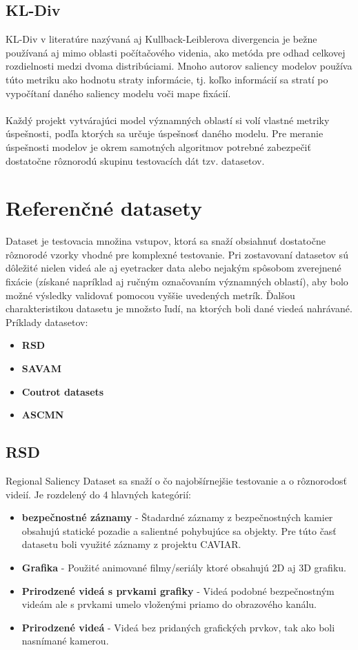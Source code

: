 \subsection{KL-Div}
KL-Div v literatúre nazývaná aj Kullback-Leiblerova divergencia\cite{kldiv} je bežne používaná aj mimo oblasti počítačového videnia, ako metóda pre odhad celkovej rozdielnosti medzi dvoma distribúciami.
Mnoho autorov saliency modelov používa túto metriku ako hodnotu straty informácie, tj. koľko informácií sa stratí po vypočítaní daného saliency modelu voči mape fixácií.
\\\\
Každý projekt vytvárajúci model významných oblastí si volí vlastné metriky úspešnosti, podľa ktorých sa určuje úspešnosť daného modelu.
Pre meranie úspešnosti modelov je okrem samotných algoritmov potrebné zabezpečiť dostatočne rôznorodú skupinu testovacích dát tzv. datasetov.

\section{Referenčné datasety}
Dataset je testovacia množina vstupov, ktorá sa snaží obsiahnuť dostatočne rôznorodé vzorky vhodné pre komplexné testovanie.
Pri zostavovaní datasetov sú dôležité nielen videá ale aj eyetracker data alebo nejakým spôsobom zverejnené fixácie (získané napríklad aj ručným označovaním významných oblastí), aby bolo možné výsledky validovať pomocou vyššie uvedených metrík.
Ďalšou charakteristikou datasetu je množsto ľudí, na ktorých boli dané viedeá nahrávané.
\\ Príklady datasetov:
\begin{itemize}
	\item \textbf{RSD}\cite{rsd}
	\item \textbf{SAVAM}\cite{savam}
	\item \textbf{Coutrot datasets}\cite{courot-dataset}
  \item \textbf{ASCMN}\cite{accv}
\end{itemize}

\subsection{RSD}
Regional Saliency Dataset sa snaží o čo najobšírnejšie testovanie a o rôznorodosť videií.
Je rozdelený do 4 hlavných kategórií:
\begin{itemize}
	\item \textbf{bezpečnostné záznamy} - Štadardné záznamy z bezpečnostných kamier obsahujú statické pozadie a salientné pohybujúce sa objekty.
Pre túto časť datasetu boli využité záznamy z projektu CAVIAR\cite{rsd-caviar}.
	\item \textbf{Grafika} - Použité animované filmy/seriály ktoré obsahujú 2D aj 3D grafiku.
  \item \textbf{Prirodzené videá s prvkami grafiky} - Videá podobné bezpečnostným videám ale s prvkami umelo vloženými priamo do obrazového kanálu.
  \item \textbf{Prirodzené videá} - Videá bez pridaných grafických prvkov, tak ako boli nasnímané kamerou.
\end{itemize}

